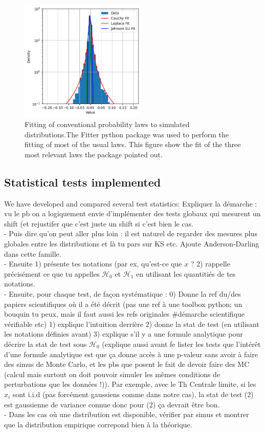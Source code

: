 \documentclass{article}
\newcommand{\dm}[1]{{\color{mulberry} #1}}
\begin{document}
\begin{figure}[H]
\centering
\includegraphics[width=6cm]{img/fits.png}
\caption{Fitting of conventional probability laws to simulated distributions.The Fitter python package was used to perform the fitting of most of the usual laws. This figure show the fit of the three most relevant laws the package pointed out.}
\label{fig:fits}
\end{figure}

\subsection{Statistical tests implemented}

We have developed and compared several test statistics:
\dm{Expliquer la démarche : vu le pb on a logiquement envie d'implémenter  des tests globaux qui mesurent un shift (et rejustifer que c'est juste un shift si c'est bien le cas.\\
- Puis dire qu'on peut aller plus loin : il est naturel de regarder des mesures plus globales entre les distributions et là tu pars sur  KS etc. Ajoute Anderson-Darling dans cette famille.\\
- Ensuite 1) présente tes notations (par ex, qu'est-ce que $x$ ? 2) rappelle précisément ce que tu appelles $\mathcal{H}_0$ et $\mathcal{H}_1$ en utilisant les quantitiés de  tes notations.\\
- Ensuite, pour chaque test, de façon systématique : 0) Donne la ref du/des papiers scientifiques où il a été décrit (pas une ref à une toolbox python; un bouquin tu peux, mais il faut aussi les refs originales \#démarche scientifique vérifiable etc) 1) explique l'intuition derrière 2) donne la stat de test (en utilisant les notations définies avant) 3) explique s'il y a une formule analytique pour décrire la stat de test sous $\mathcal{H}_0$ (explique aussi avant fe lister les tests  que l'intérêt d'une formule analytique est  que ça donne accès à une p-valeur sans avoir à faire des simus de Monte Carlo, et les pbs que posent le fait de devoir faire des MC (calcul mais surtout on doit pouvoir simuler les mêmes conditions de perturbations que les données !)). Par exemple, avec le Th Centrale limite, si les $x_i$ sont i.i.d (pas forcément gaussiens comme dans notre cas), la stat de test (2) est gaussienne de variance connue donc pour (2) ça devrait être bon.\\
- Dans les cas où une distribution est disponible, vérifier par simus et montrer que la distribution empirique correpond bien à la théorique. }
\end{document}
